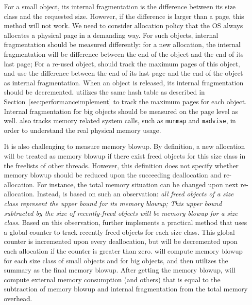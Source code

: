 For a small object, its internal fragmentation is the difference between its size class and the requested size. However, if the difference is larger than a page, this method will not work. We need to consider allocation policy that the OS always allocates a physical page in a demanding way. For such objects, internal fragmentation should be measured differently: for a new allocation, the internal fragmentation will be difference between the end of the object and the end of its last page; For a re-used object, \MP{} should track the maximum pages of this object, and use the difference between the end of its last page and the end of the object as internal fragmentation. When an object is released, its internal fragmentation should be decremented. \MP{} utilizes the same hash table as described in Section~\ref{sec:performanceimplement} to track the maximum pages for each object. Internal fragmentation for big objects should be measured on the page level as well. \MP{} also tracks memory related system calls, such as \texttt{munmap} and \texttt{madvise}, in order to understand the real physical memory usage.  

It is also challenging to measure memory blowup. By definition, a new allocation will be treated as memory blowup if there exist freed objects for this size class in the freelists of other threads. However, this definition does not specify whether memory blowup should be reduced upon the succeeding deallocation and re-allocation. For instance, the total memory situation can be changed upon next re-allocation. Instead, \MP{} is based on such an observation: \textit{all freed objects of a size class represent the upper bound for its memory blowup; This upper bound subtracted by the size of recently-freed objects will be memory blowup for a size class}. Based on this observation, \MP{} further implements a practical method that uses a global counter to track recently-freed objects for each size class. This global counter is incremented upon every deallocation, but will be decremented upon each allocation if the counter is greater than zero. \MP{} will compute memory blowup for each size class of small objects and for big objects, and then utilizes the summary as the final memory blowup. After getting the memory blowup, \MP{} will compute external memory consumption (and others) that is equal to the subtraction of memory blowup and internal fragmentation from the total memory overhead.

